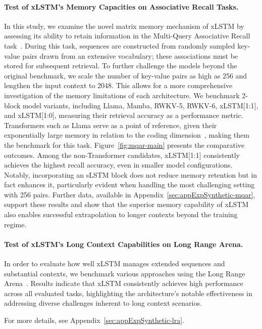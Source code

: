 \paragraph{Test of xLSTM's Memory Capacities on Associative Recall Tasks.} In this study, we examine the novel matrix memory mechanism of xLSTM by assessing its ability to retain information in the Multi-Query Associative Recall task~\citep{Arora:23arxiv}. During this task, sequences are constructed from randomly sampled key-value pairs drawn from an extensive vocabulary; these associations must be stored for subsequent retrieval. To further challenge the models beyond the original benchmark, we scale the number of key-value pairs as high as 256 and lengthen the input context to 2048. This allows for a more comprehensive investigation of the memory limitations of each architecture. We benchmark 2-block model variants, including Llama, Mamba, RWKV-5, RWKV-6, xLSTM[1:1], and xLSTM[1:0], measuring their retrieval accuracy as a performance metric. Transformers such as Llama serve as a point of reference, given their exponentially large memory in relation to the coding dimension~\citep{Ramsauer:21}, making them the benchmark for this task. Figure~\ref{fig:mqar-main} presents the comparative outcomes. Among the non-Transformer candidates, xLSTM[1:1] consistently achieves the highest recall accuracy, even in smaller model configurations. Notably, incorporating an sLSTM block does not reduce memory retention but in fact enhances it, particularly evident when handling the most challenging setting with 256 pairs. Further data, available in Appendix~\ref{sec:appExpSynthetic-mqar}, support these results and show that the superior memory capability of xLSTM also enables successful extrapolation to longer contexts beyond the training regime.

\paragraph{Test of xLSTM's Long Context Capabilities on Long Range Arena.} In order to evaluate how well xLSTM manages extended sequences and substantial contexts, we benchmark various approaches using the Long Range Arena~\citep{Tay:21}. Results indicate that xLSTM consistently achieves high performance across all evaluated tasks, highlighting the architecture's notable effectiveness in addressing diverse challenges inherent to long context scenarios.

For more details, see Appendix~\ref{sec:appExpSynthetic-lra}.

